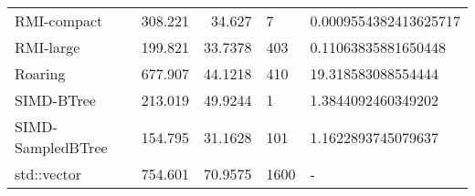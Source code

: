 \begin{tabular}{lrrll}
 RMI-compact       &                308.221 &               34.627  & 7            & 0.0009554382413625717 \\
 RMI-large         &                199.821 &               33.7378 & 403          & 0.11063835881650448   \\
 Roaring           &                677.907 &               44.1218 & 410          & 19.318583088554444    \\
 SIMD-BTree        &                213.019 &               49.9244 & 1            & 1.3844092460349202    \\
 SIMD-SampledBTree &                154.795 &               31.1628 & 101          & 1.1622893745079637    \\
 std::vector       &                754.601 &               70.9575 & 1600         & -                     \\
\hline
\end{tabular}